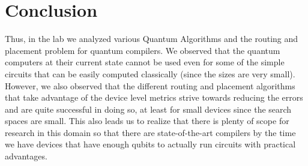 \documentclass[11pt]{article}
\begin{document}
\section{Conclusion}
Thus, in the lab we analyzed various Quantum Algorithms and the routing and placement problem for quantum compilers. We observed that the quantum computers at their current state cannot be used even for some of the simple circuits that can be easily computed classically (since the sizes are very small). However, we also observed that the different routing and placement algorithms that take advantage of the device level metrics strive towards reducing the errors and are quite successful in doing so, at least for small devices since the search spaces are small. This also leads us to realize that there is plenty of scope for research in this domain so that there are state-of-the-art compilers by the time we have devices that have enough qubits to actually run circuits with practical advantages.
\end{document}
